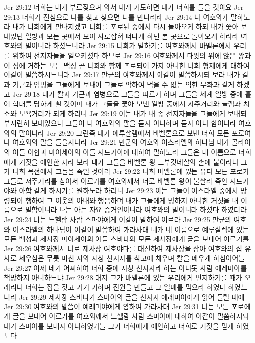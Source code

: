 Jer 29:12  너희는 내게 부르짖으며 와서 내게 기도하면 내가 너희를 들을 것이요
Jer 29:13  너희가 전심으로 나를 찾고 찾으면 나를 만나리라
Jer 29:14  나 여호와가 말하노라 내가 너희에게 만나지겠고 너희를 포로된 중에서 다시 돌아오게 하되 내가 쫓아 보내었던 열방과 모든 곳에서 모아 사로잡혀 떠나게 하던 본 곳으로 돌아오게 하리라 여호와의 말이니라 하셨느니라
Jer 29:15  너희가 말하기를 여호와께서 바벨론에서 우리를 위하여 선지자들을 일으키셨다 하므로
Jer 29:16  여호와께서 다윗의 위에 앉은 왕과 이 성에 거하는 모든 백성 곧 너희와 함께 포로되어 가지 아니한 너희 형제에게 대하여 이같이 말씀하시느니라
Jer 29:17  만군의 여호와께서 이같이 말씀하시되 보라 내가 칼과 기근과 염병을 그들에게 보내어 그들로 악하여 먹을 수 없는 악한 무화과 같게 하겠고
Jer 29:18  내가 칼과 기근과 염병으로 그들을 따르게 하며 그들을 세계 열방 중에 흩어 학대를 당하게 할 것이며 내가 그들을 쫓아 보낸 열방 중에서 저주거리와 놀램과 치소와 모욕거리가 되게 하리니
Jer 29:19  이는 내가 내 종 선지자들을 그들에게 보내되 부지런히 보내었으나 그들이 나 여호와의 말을 듣지 아니하며 듣지 아니 함이니라 여호와의 말이니라
Jer 29:20  그런즉 내가 예루살렘에서 바벨론으로 보낸 너희 모든 포로여 나 여호와의 말을 들을지니라
Jer 29:21  만군의 여호와 이스라엘의 하나님 내가 골라야의 아들 아합과 마아세야의 아들 시드기야에 대하여 말하노라 그들은 내 이름으로 너희에게 거짓을 예언한 자라 보라 내가 그들을 바벨론 왕 느부갓네살의 손에 붙이리니 그가 너희 목전에서 그들을 죽일 것이라
Jer 29:22  너희 바벨론에 있는 유다 모든 포로가 그들로 저주거리를 삼아서 이르기를 여호와께서 너로 바벨론 왕이 불살라 죽인 시드기야와 아합 같게 하시기를 원하노라 하리니
Jer 29:23  이는 그들이 이스라엘 중에서 망령되이 행하여 그 이웃의 아내와 행음하며 내가 그들에게 명하지 아니한 거짓을 내 이름으로 말함이니라 나는 아는 자요 증거인이니라 여호와의 말이니라 하셨다 하였더라
Jer 29:24  너는 느헬람 사람 스마야에게 이같이 말하여 이르라
Jer 29:25  만군의 여호와 이스라엘의 하나님이 이같이 말씀하여 가라사대 네가 네 이름으로 예루살렘에 있는 모든 백성과 제사장 마아세야의 아들 스바냐와 모든 제사장에게 글을 보내어 이르기를
Jer 29:26  여호와께서 너로 제사장 여호야다를 대신하여 제사장을 삼아 여호와의 집 유사로 세우심은 무릇 미친 자와 자칭 선지자를 착고에 채우며 칼을 메우게 하심이어늘
Jer 29:27  이제 네가 어찌하여 너희 중에 자칭 선지자라 하는 아나돗 사람 예레미야를 책망하지 아니하느냐
Jer 29:28  대저 그가 바벨론에 있는 우리에게 편지하기를 때가 오래리니 너희는 집을 짓고 거기 거하며 전원을 만들고 그 열매를 먹으라 하였다 하였느니라
Jer 29:29  제사장 스바냐가 스마야의 글을 선지자 예레미야에게 읽어 들릴 때에
Jer 29:30  여호와의 말씀이 예레미야에게 임하여 가라사대
Jer 29:31  너는 모든 포로에게 글을 보내어 이르기를 여호와께서 느헬람 사람 스마야에 대하여 이같이 말씀하시되 내가 스마야를 보내지 아니하였거늘 그가 너희에게 예언하고 너희로 거짓을 믿게 하였도다
